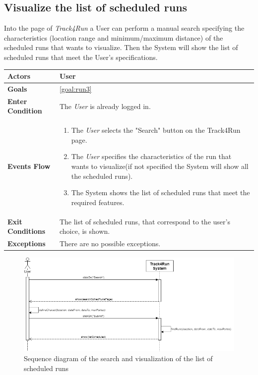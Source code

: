  \subsection{Visualize the list of scheduled runs}
Into the page of \emph{Track4Run} a User can perform a manual search specifying the characteristics (location range and minimum/maximum distance) of the scheduled runs that wants to visualize. Then the System will show the list of scheduled runs that meet the User's specifications. 

\begin{table}[H]
	\centering
    
    \begin{tabular}{|p{3.5cm}|p{10.3cm}|}
    
    \hline
    \textbf{\large{Actors}}  			& \tabitem User 	\\
    				 					
    \hline
    \textbf{\large{Goals}} 				& \ref{goal:run3}\\
    
    \hline
    \textbf{\large{Enter Condition}}	& The \emph{User} is already logged in.		\\
    
    \hline
    \textbf{\large{Events Flow}}		& \begin{enumerate}[leftmargin=0.5cm]
            	                            \item The \emph{User} selects the "Search" button on the Track4Run page.
                                          	\item The \emph{User} specifies the characteristics of the run that wants to visualize(if not specified the System will show all the scheduled runs).  
                                          	 \item The System shows the list of scheduled runs that meet the required features.
                                          \end{enumerate}
    										\\
    \hline
    \textbf{\large{Exit Conditions}}    & The list of scheduled runs, that correspond to the user's choice, is shown.  \\
    
    \hline
    \textbf{\large{Exceptions}} 		& There are no possible exceptions.\\
    
    \hline
    
    
    \end{tabular}
	
\end{table}

\begin{figure}[H]
    \centering
    \includegraphics[scale=0.4]{Pictures/visListSchedRunsSeqDiag.png}
    \caption{Sequence diagram of the search and visualization of the list of scheduled runs}
\end{figure}
